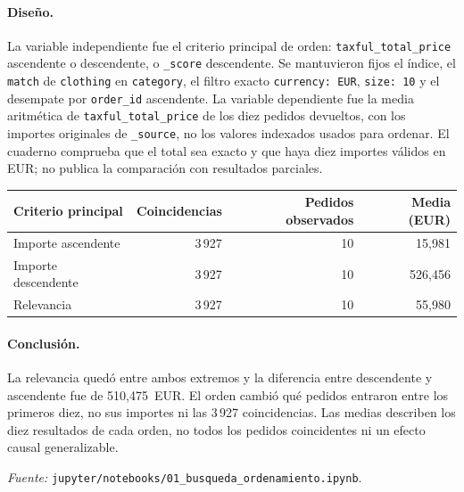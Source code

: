 \documentclass[11pt,a4paper]{article}
\newcommand{\codigo}[1]{\texttt{#1}}
\newcommand{\fuente}[1]{\par\smallskip\noindent\textit{Fuente:} #1\par}
\begin{document}
\paragraph{Diseño.}
La variable independiente fue el criterio principal de orden:
\codigo{taxful\_total\_price} ascendente o descendente, o \codigo{\_score}
descendente. Se mantuvieron fijos el índice, el \codigo{match} de
\codigo{clothing} en \codigo{category}, el filtro exacto \codigo{currency: EUR},
\codigo{size: 10} y el desempate por \codigo{order\_id} ascendente.
La variable dependiente fue la media aritmética de
\codigo{taxful\_total\_price} de los diez pedidos devueltos, con los importes
originales de \codigo{\_source}, no los valores indexados usados para ordenar.
El cuaderno comprueba que el total sea exacto y que haya diez importes válidos
en EUR; no publica la comparación con resultados parciales.

\begin{center}
\begin{tabular}{lrrr}
\toprule
Criterio principal & Coincidencias & Pedidos observados & Media (EUR)\\
\midrule
Importe ascendente  & 3\,927 & 10 & 15,981\\
Importe descendente & 3\,927 & 10 & 526,456\\
Relevancia          & 3\,927 & 10 & 55,980\\
\bottomrule
\end{tabular}
\end{center}

\begin{center}
\end{center}

\paragraph{Conclusión.}
La relevancia quedó entre ambos extremos y la diferencia entre descendente
y ascendente fue de 510,475~EUR. El orden cambió qué pedidos entraron entre
los primeros diez, no sus importes ni las 3\,927 coincidencias. Las medias
describen los diez resultados de cada orden, no todos los pedidos coincidentes
ni un efecto causal generalizable.
\fuente{\nolinkurl{jupyter/notebooks/01_busqueda_ordenamiento.ipynb}.}
\end{document}

